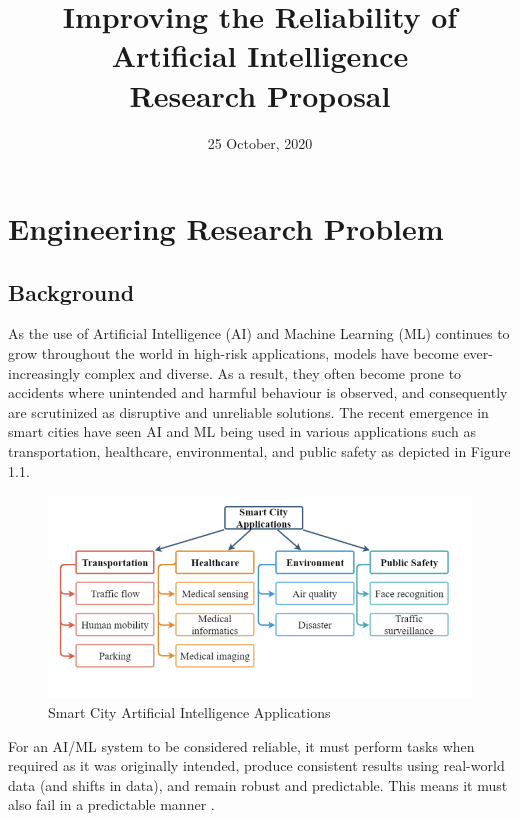 \documentclass[a4paper,12pt]{report}
\title{\Huge{\textbf{Improving the Reliability of Artificial Intelligence}}\\
\vspace*{0.3cm}
\Large{Research Proposal}}
\date{25 October, 2020}
\begin{document}
\maketitle
\tableofcontents
\listoffigures
\listoftables
\setcounter{page}{1}

\chapter{Engineering Research Problem}
\label{chap:chap1}

\section{Background }
As the use of Artificial Intelligence (AI) and Machine 
Learning (ML) continues to grow throughout the world 
in high-risk applications, models have become 
ever-increasingly complex and diverse. As a result, 
they often become prone to accidents where unintended 
and harmful behaviour is observed, and consequently are 
scrutinized as disruptive and unreliable solutions. The 
recent emergence in smart cities have seen AI and ML being 
used in various applications such as transportation, 
healthcare, environmental, and public safety as depicted in Figure 1.1.

\begin{figure}[h]
    \includegraphics{smart_city_applications.png}
    \caption{Smart City Artificial Intelligence Applications \cite{chen}}
    \label{fig:smart}
\end{figure}

\enlargethispage{\baselineskip}
For an AI/ML system to be considered reliable, it must 
perform tasks when required as it was originally 
intended, produce consistent results using real-world 
data (and shifts in data), and remain robust and 
predictable. This means it must also fail in a 
predictable manner \cite{Saif}. 
\end{document}
